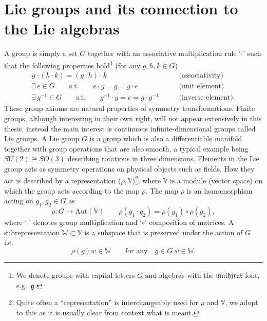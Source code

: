 \section{Lie groups and its connection to the Lie algebras}\label{sec:groups}
A group is simply a set $G$ together with an associative multiplication rule `$\cdot$' such that the following properties hold\footnote{We denote groups with capital letters $G$ and algebras with the $\mathfrak{mathfrak}$ font, e.g.\ $\mathfrak{g}$.} (for any $g,h,k\in G$)
\begin{align*}
    g\cdot \left(h\cdot k\right) = \left(g\cdot h\right)\cdot k \qquad &\text{(associativity)}\\
    \exists\, e \in G \qquad \text{s.t.} \qquad e\cdot g = g = g \cdot e\qquad &\text{(unit element)}\\
    \exists\, g^{-1}\in G\qquad \text{s.t.}\qquad g^{-1}\cdot g = e = g\cdot g^{-1} \qquad &\text{(inverse element)}.
\end{align*}
These group axioms are natural properties of symmetry transformations. Finite groups, although interesting in their own right, will not appear extensively in this thesis, instead the main interest is continuous infinite-dimensional groups called Lie groups. A Lie group $G$ is a group which is also a differentiable manifold together with group operations that are also smooth, a typical example being $SU(2)\cong SO(3)$ describing rotations in three dimensions. Elements in the Lie group acts as symmetry operations on physical objects such as fields. How they act is described by a representation ($\rho,\mathbb{V}$)\footnote{Quite often a ``representation'' is interchangeably used for $\rho$ and $\mathbb{V}$, we adopt to this as it is usually clear from context what is meant.}, where $\mathbb{V}$ is a module (vector space) on which the group acts according to the map $\rho$. The map $\rho$ is an homomorphism acting on $g_1,g_2\in G$ as
\begin{equation}
    \rho : G\to \text{Aut}(\mathbb{V}) \qquad \rho(g_1\cdot g_2) = \rho(g_1)\circ\rho(g_2),
\end{equation}
where `$\cdot$' denotes group multiplication and `$\circ$' composition of matrices. A subrepresentation $\mathbb{W}\subset\mathbb{V}$ is a subspace that is preserved under the action of $G$ i.e.\
\begin{equation}
    \rho(g)w \in \mathbb{W} \qquad \text{for any} \quad g\in G\, w\in\mathbb{W}.
\end{equation}
